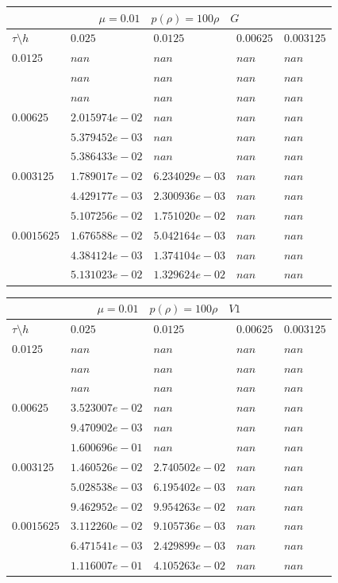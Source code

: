 \documentclass[a4paper,12pt]{extarticle}
\begin{document}
\begin{tabular}{|l|l|l|l|l|}
	\hline
	\multicolumn{5}{|c|}{$\mu =0.01 \quad  p(\rho) =100 \rho \quad G$}\\
	\hline
	$\tau\setminus h$ & $0.025$ & $0.0125$ & $0.00625$ & $0.003125$\\
	\hline
	$0.0125$  & $nan$ & $nan$ & $nan$ & $nan$\\
	& $nan$ & $nan$ & $nan$ & $nan$\\
	& $nan$ & $nan$ & $nan$ & $nan$\\
	\hline
	$0.00625$  & $2.015974e-02$ & $nan$ & $nan$ & $nan$\\
	& $5.379452e-03$ & $nan$ & $nan$ & $nan$\\
	& $5.386433e-02$ & $nan$ & $nan$ & $nan$\\
	\hline
	$0.003125$  & $1.789017e-02$ & $6.234029e-03$ & $nan$ & $nan$\\
	& $4.429177e-03$ & $2.300936e-03$ & $nan$ & $nan$\\
	& $5.107256e-02$ & $1.751020e-02$ & $nan$ & $nan$\\
	\hline
	$0.0015625$  & $1.676588e-02$ & $5.042164e-03$ & $nan$ & $nan$\\
	& $4.384124e-03$ & $1.374104e-03$ & $nan$ & $nan$\\
	& $5.131023e-02$ & $1.329624e-02$ & $nan$ & $nan$\\
	\hline
\end{tabular}

\begin{tabular}{|l|l|l|l|l|}
	\hline
	\multicolumn{5}{|c|}{$\mu =0.01 \quad  p(\rho) =100 \rho \quad V1$}\\
	\hline
	$\tau\setminus h$ & $0.025$ & $0.0125$ & $0.00625$ & $0.003125$\\
	\hline
	$0.0125$  & $nan$ & $nan$ & $nan$ & $nan$\\
	& $nan$ & $nan$ & $nan$ & $nan$\\
	& $nan$ & $nan$ & $nan$ & $nan$\\
	\hline
	$0.00625$  & $3.523007e-02$ & $nan$ & $nan$ & $nan$\\
	& $9.470902e-03$ & $nan$ & $nan$ & $nan$\\
	& $1.600696e-01$ & $nan$ & $nan$ & $nan$\\
	\hline
	$0.003125$  & $1.460526e-02$ & $2.740502e-02$ & $nan$ & $nan$\\
	& $5.028538e-03$ & $6.195402e-03$ & $nan$ & $nan$\\
	& $9.462952e-02$ & $9.954263e-02$ & $nan$ & $nan$\\
	\hline
	$0.0015625$  & $3.112260e-02$ & $9.105736e-03$ & $nan$ & $nan$\\
	& $6.471541e-03$ & $2.429899e-03$ & $nan$ & $nan$\\
	& $1.116007e-01$ & $4.105263e-02$ & $nan$ & $nan$\\
	\hline
\end{tabular}
\end{document}
